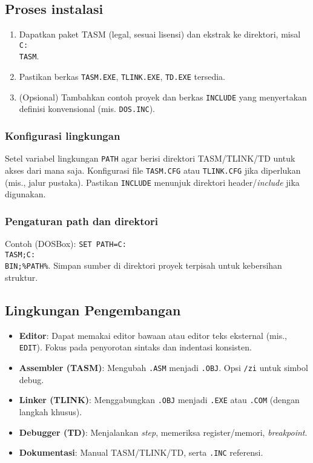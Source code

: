 \documentclass[../main.tex]{subfiles}
\begin{document}
\subsection{Proses instalasi}
\begin{enumerate}
  \item Dapatkan paket TASM (legal, sesuai lisensi) dan ekstrak ke direktori, misal \texttt{C:\\TASM}.
  \item Pastikan berkas \texttt{TASM.EXE}, \texttt{TLINK.EXE}, \texttt{TD.EXE} tersedia.
  \item (Opsional) Tambahkan contoh proyek dan berkas \texttt{INCLUDE} yang menyertakan definisi konvensional (mis. \texttt{DOS.INC}).
\end{enumerate}

\subsubsection{Konfigurasi lingkungan}
Setel variabel lingkungan \texttt{PATH} agar berisi direktori TASM/TLINK/TD untuk akses dari mana saja. Konfigurasi file \texttt{TASM.CFG} atau \texttt{TLINK.CFG} jika diperlukan (mis., jalur pustaka). Pastikan \texttt{INCLUDE} menunjuk direktori header/\textit{include} jika digunakan.

\subsubsection{Pengaturan path dan direktori}
Contoh (DOSBox): \texttt{SET PATH=C:\\TASM;C:\\BIN;\%PATH\%}. Simpan sumber di direktori proyek terpisah untuk kebersihan struktur.

\subsection{Lingkungan Pengembangan}
\begin{itemize}
  \item \textbf{Editor}: Dapat memakai editor bawaan atau editor teks eksternal (mis., \texttt{EDIT}). Fokus pada penyorotan sintaks dan indentasi konsisten.
  \item \textbf{Assembler (TASM)}: Mengubah \texttt{.ASM} menjadi \texttt{.OBJ}. Opsi \texttt{/zi} untuk simbol debug.
  \item \textbf{Linker (TLINK)}: Menggabungkan \texttt{.OBJ} menjadi \texttt{.EXE} atau \texttt{.COM} (dengan langkah khusus).
  \item \textbf{Debugger (TD)}: Menjalankan \textit{step}, memeriksa register/memori, \textit{breakpoint}.
  \item \textbf{Dokumentasi}: Manual TASM/TLINK/TD, serta \texttt{.INC} referensi.
\end{itemize}
\end{document}
